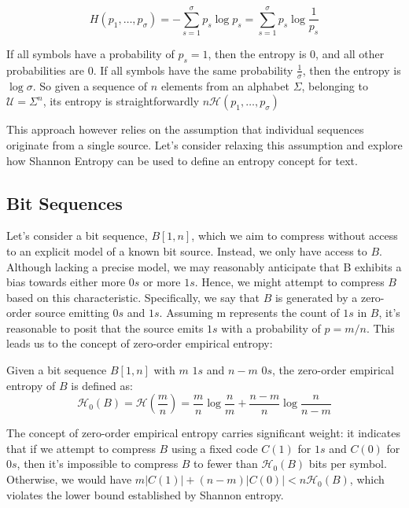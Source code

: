 \[
H(p_1, \ldots, p_{\sigma}) = - \sum_{s=1}^{\sigma} p_s \log p_s = \sum_{s=1}^{\sigma} p_s \log \frac{1}{p_s}
\]

\begin{remark}
    If all symbols have a probability of $p_s =1$, then the entropy is $0$, and all other probabilities are $0$. If all symbols have the same probability $\frac{1}{\sigma}$, then the entropy is $\log \sigma$. So given a sequence of $n$ elements from an alphabet $\Sigma$, belonging to $\mathcal{U} = \Sigma^n$, its entropy is straightforwardly $n \mathcal{H}(p_1, \ldots, p_{\sigma})$
\end{remark}

\noindent This approach however relies on the assumption that individual sequences originate from a single source. Let's consider relaxing this assumption and explore how Shannon Entropy can be used to define an entropy concept for text.

\subsection{Bit Sequences}
Let's consider a bit sequence, $B[1, n]$, which we aim to compress without access to an explicit model of a known bit source. Instead, we only have access to $B$. Although lacking a precise model, we may reasonably anticipate that B exhibits a bias towards either more $0s$ or more $1s$. Hence, we might attempt to compress $B$ based on this characteristic. Specifically, we say that $B$ is generated by a zero-order source emitting $0s$ and $1s$. Assuming m represents the count of $1s$ in $B$, it's reasonable to posit that the source emits $1s$ with a probability of $p = m/n$. This leads us to the concept of zero-order empirical entropy:

\begin{definition}
    Given a bit sequence $B[1, n]$ with $m$ $1s$ and $n-m$ $0s$, the zero-order empirical entropy of $B$ is defined as:
   \begin{equation}
     \mathcal{H}_0(B) = \mathcal{H} \left( \frac{m}{n} \right) =\frac{m}{n} \log \frac{n}{m} + \frac{n-m}{n} \log \frac{n}{n-m}
   \end{equation}
\end{definition}
\noindent The concept of zero-order empirical entropy carries significant weight: it indicates that if we attempt to compress $B$ using a fixed code $C(1)$ for $1s$ and $C(0)$ for $0s$, then it's impossible to compress $B$ to fewer than $\mathcal{H}_0(B)$ bits per symbol. Otherwise, we would have $m |C(1)| + (n-m) |C(0)| < n \mathcal{H}_0(B)$, which violates the lower bound established by Shannon entropy.

